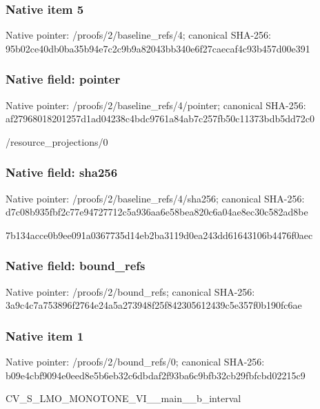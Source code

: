 \documentclass[10pt,a4paper]{article}
\begin{document}
\subsubsection{Native item 5}
Native pointer: /proofs/2/baseline\_\allowbreak{}refs/4; canonical SHA-256: 95b02ce40db0ba35b94e7c2c9b9a82043bb340e6f27caecaf4c93b457d00e391

\subsubsection{Native field: pointer}
Native pointer: /proofs/2/baseline\_\allowbreak{}refs/4/pointer; canonical SHA-256: af27968018201257d1ad04238c4bdc9761a84ab7c257fb50c11373bdb5dd72c0

\begingroup\raggedright\sloppy /\allowbreak{}resource\_\allowbreak{}projections/\allowbreak{}0\par\endgroup

\subsubsection{Native field: sha256}
Native pointer: /proofs/2/baseline\_\allowbreak{}refs/4/sha256; canonical SHA-256: d7c08b935fbf2c77e94727712c5a936aa6e58bea820c6a04ae8ec30c582ad8be

\begingroup\raggedright\sloppy 7b134acce0b9ee091a0367735d14eb2ba3119d0ea243dd61643106b4476f0aec\par\endgroup

\subsubsection{Native field: bound\_\allowbreak{}refs}
Native pointer: /proofs/2/bound\_\allowbreak{}refs; canonical SHA-256: 3a9c4c7a753896f2764e24a5a273948f25f842305612439c5e357f0b190fc6ae

\subsubsection{Native item 1}
Native pointer: /proofs/2/bound\_\allowbreak{}refs/0; canonical SHA-256: b09e4cbf9094e0eed8e5b6eb32c6dbdaf2f93ba6c9bfb32cb29fbfcbd02215c9

\begingroup\raggedright\sloppy CV\_\allowbreak{}S\_\allowbreak{}LMO\_\allowbreak{}MONOTONE\_\allowbreak{}VI\_\allowbreak{}\_\allowbreak{}main\_\allowbreak{}\_\allowbreak{}b\_\allowbreak{}interval\par\endgroup
\end{document}

